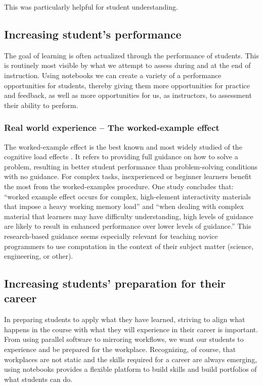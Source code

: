 \documentclass[]{book}
\begin{document}
This was particularly helpful for student understanding.

\subsection{Increasing student's
performance}\label{increasing-students-performance}

The goal of learning is often actualized through the performance of
students. This is routinely most visible by what we attempt to assess
during and at the end of instruction. Using notebooks we can create a
variety of a performance opportunities for students, thereby giving them
more opportunities for practice and feedback, as well as more
opportunities for us, as instructors, to assessment their ability to
perform.

\subsubsection{Real world experience -- The worked-example
effect}\label{real-world-experience-the-worked-example-effect}

The worked-example effect is the best known and most widely studied of
the cognitive load effects \citep{sweller2006worked}. It refers to
providing full guidance on how to solve a problem, resulting in better
student performance than problem-solving conditions with no guidance.
For complex tasks, inexperienced or beginner learners benefit the most
from the worked-examples procedure. One study \citep{chen2015worked}
concludes that: ``worked example effect occurs for complex, high-element
interactivity materials that impose a heavy working memory load'' and
``when dealing with complex material that learners may have difficulty
understanding, high levels of guidance are likely to result in enhanced
performance over lower levels of guidance.'' This research-based
guidance seems especially relevant for teaching novice programmers to
use computation in the context of their subject matter (science,
engineering, or other).

\subsection{Increasing students' preparation for their
career}\label{increasing-students-preparation-for-their-career}

In preparing students to apply what they have learned, striving to align
what happens in the course with what they will experience in their
career is important. From using parallel software to mirroring
workflows, we want our students to experience and be prepared for the
workplace. Recognizing, of course, that workplaces are not static and
the skills required for a career are always emerging, using notebooks
provides a flexible platform to build skills and build portfolios of
what students can do.
\end{document}
